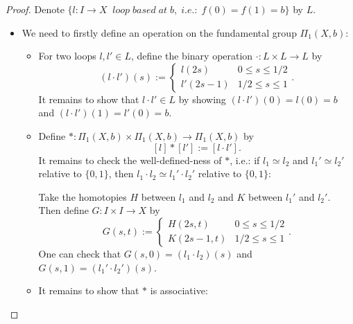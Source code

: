 \begin{proof}
    Denote $\{ l : I \rightarrow X \;\;loop\;based\;at\;b,\;i.e.:\;f(0)=f(1)=b \}$ by $L$.
    \begin{itemize}
        \item We need to firstly define an operation on the fundamental group $\Pi_1 (X,b)$: 
        \begin{itemize}
            \item For two loops $l,l' \in L$, define the binary operation $\cdot : L \times L \rightarrow L$ by
            $$(l \cdot l') (s) := \begin{cases}
                l(2s) &0 \leq s \leq 1/2\\
                l'(2s-1) &1/2 \leq s \leq 1
            \end{cases}.$$
            It remains to show that $l \cdot l' \in L$ by showing $(l \cdot l')(0) = l(0) =b $ and $ (l \cdot l') (1) = l'(0) = b$.
            \item Define $* : \Pi_1 (X,b) \times \Pi_1 (X,b) \rightarrow \Pi_1 (X,b)$ by
            $$[l] * [l'] := [l \cdot l'].$$
            It remains to check the well-defined-ness of $*$, i.e.: if $l_1 \simeq l_2$ and $l_1' \simeq l_2'$ relative to $\{0,1\}$, then $l_1 \cdot l_2 \simeq l_1' \cdot l_2'$ relative to $\{0,1\}$: 
            
            Take the homotopies $H$ between $l_1$ and $l_2$ and $K$ between $l_1'$ and $l_2'$. Then define $G : I \times I \rightarrow X$ by
            $$G(s,t) :=\begin{cases}
                H(2s,t) &0\leq s \leq 1/2\\
                K(2s-1,t) &1/2 \leq s \leq 1
            \end{cases}.$$
            One can check that $G(s,0) = (l_1 \cdot l_2) (s)$ and $G(s,1) = (l_1' \cdot l_2') (s)$.
            \item It remains to show that $*$ is associative: 
            

\end{itemize}
\end{itemize}
\end{proof}
